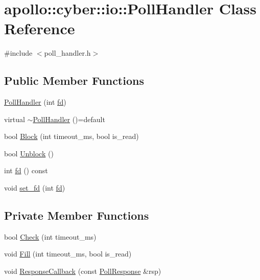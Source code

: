 \hypertarget{classapollo_1_1cyber_1_1io_1_1PollHandler}{\section{apollo\-:\-:cyber\-:\-:io\-:\-:Poll\-Handler Class Reference}
\label{classapollo_1_1cyber_1_1io_1_1PollHandler}
}


{\ttfamily \#include $<$poll\-\_\-handler.\-h$>$}

\subsection*{Public Member Functions}
\begin{DoxyCompactItemize}
\item 
\hyperlink{classapollo_1_1cyber_1_1io_1_1PollHandler_a76ca72e5b1d11a8637c25780cde5a4f9}{Poll\-Handler} (int \hyperlink{classapollo_1_1cyber_1_1io_1_1PollHandler_a96bc89096b9d14e90757aa45c718dc7e}{fd})
\item 
virtual \hyperlink{classapollo_1_1cyber_1_1io_1_1PollHandler_a8297452d3e48919663e1321037bb2dd5}{$\sim$\-Poll\-Handler} ()=default
\item 
bool \hyperlink{classapollo_1_1cyber_1_1io_1_1PollHandler_aa961d347555371be6a427b4486c3fbee}{Block} (int timeout\-\_\-ms, bool is\-\_\-read)
\item 
bool \hyperlink{classapollo_1_1cyber_1_1io_1_1PollHandler_aa2495fb2fefe8a3d177d3cbd8a0747e3}{Unblock} ()
\item 
int \hyperlink{classapollo_1_1cyber_1_1io_1_1PollHandler_a96bc89096b9d14e90757aa45c718dc7e}{fd} () const 
\item 
void \hyperlink{classapollo_1_1cyber_1_1io_1_1PollHandler_a3a87743decf43bacbc7ee33020897af7}{set\-\_\-fd} (int \hyperlink{classapollo_1_1cyber_1_1io_1_1PollHandler_a96bc89096b9d14e90757aa45c718dc7e}{fd})
\end{DoxyCompactItemize}
\subsection*{Private Member Functions}
\begin{DoxyCompactItemize}
\item 
bool \hyperlink{classapollo_1_1cyber_1_1io_1_1PollHandler_a27097ea224090326391a17873b5aaeac}{Check} (int timeout\-\_\-ms)
\item 
void \hyperlink{classapollo_1_1cyber_1_1io_1_1PollHandler_a88c449c8d5906053d201128b17a7bfb3}{Fill} (int timeout\-\_\-ms, bool is\-\_\-read)
\item 
void \hyperlink{classapollo_1_1cyber_1_1io_1_1PollHandler_a5e401e4bbca6a9b81787816c9e89cc6c}{Response\-Callback} (const \hyperlink{structapollo_1_1cyber_1_1io_1_1PollResponse}{Poll\-Response} \&rsp)
\end{DoxyCompactItemize}
